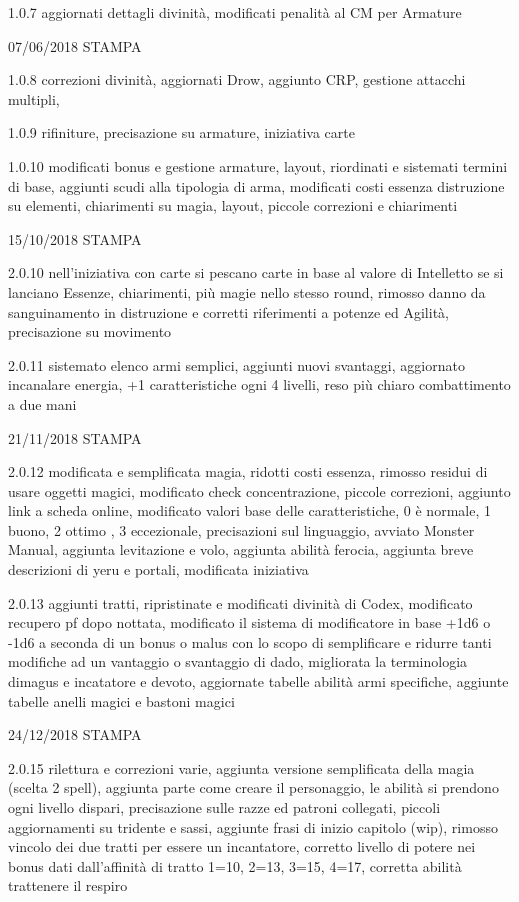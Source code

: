 \documentclass[a4paper,11pt,twoside,openany]{book}
\begin{document}
{{	1.0.7 aggiornati dettagli divinità, modificati penalità al CM per Armature

	07/06/2018 STAMPA

	1.0.8 correzioni divinità, aggiornati Drow, aggiunto CRP, gestione attacchi multipli,

	1.0.9 rifiniture, precisazione su armature, iniziativa carte

	1.0.10 modificati bonus e gestione armature, layout, riordinati e sistemati termini di base, aggiunti scudi alla tipologia di arma, modificati costi essenza distruzione su elementi, chiarimenti su magia, layout, piccole correzioni e chiarimenti

	15/10/2018 STAMPA

	2.0.10 nell'iniziativa con carte si pescano carte in base al valore di Intelletto se si lanciano Essenze, chiarimenti, più magie nello stesso round, rimosso danno da sanguinamento in distruzione e corretti riferimenti a potenze ed Agilità, precisazione su movimento

	2.0.11 sistemato elenco armi semplici, aggiunti nuovi svantaggi, aggiornato incanalare energia, +1 caratteristiche ogni 4 livelli, reso più chiaro combattimento a due mani

	21/11/2018 STAMPA

	2.0.12 modificata e semplificata magia, ridotti costi essenza, rimosso residui di usare oggetti magici, modificato check concentrazione, piccole correzioni, aggiunto link a scheda online, modificato valori base delle caratteristiche, 0 è normale, 1 buono, 2 ottimo , 3 eccezionale, precisazioni sul linguaggio, avviato Monster Manual, aggiunta levitazione e volo, aggiunta abilità ferocia, aggiunta breve descrizioni di yeru e portali, modificata iniziativa

	2.0.13 aggiunti tratti, ripristinate e modificati divinità di Codex, modificato recupero pf dopo nottata, modificato il sistema di modificatore in base +1d6 o -1d6 a seconda di un bonus o malus con lo scopo di semplificare e ridurre tanti modifiche ad un vantaggio o svantaggio di dado, migliorata la terminologia dimagus e incatatore e devoto, aggiornate tabelle abilità armi specifiche, aggiunte tabelle anelli magici e bastoni magici

	24/12/2018 STAMPA

	2.0.15 rilettura e correzioni varie, aggiunta versione semplificata della magia (scelta 2 spell), aggiunta parte come creare il personaggio, le abilità si prendono ogni livello dispari, precisazione sulle razze ed patroni collegati, piccoli aggiornamenti su tridente e sassi, aggiunte frasi di inizio capitolo (wip), rimosso vincolo dei due tratti per essere un incantatore, corretto livello di potere nei bonus dati dall'affinità di tratto 1=10, 2=13, 3=15, 4=17, corretta abilità trattenere il respiro

}}
\end{document}
